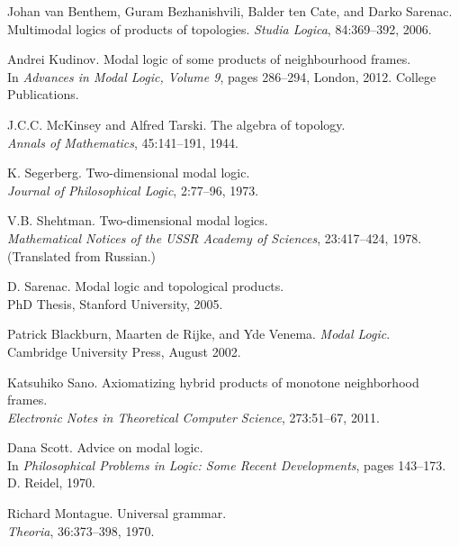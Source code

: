 \documentclass[12pt, a4paper]{scrartcl}
\begin{document}
\begin{enumerate}[label={[{\arabic*}]}]

\item Johan van Benthem, Guram Bezhanishvili, Balder ten Cate, and Darko Sarenac.\\
Multimodal logics of products of topologies. \textit{Studia Logica}, 84:369–392, 2006.

\item Andrei Kudinov. Modal logic of some products of neighbourhood frames.\\
In \textit{Advances in Modal Logic, Volume 9}, pages 286–294, London, 2012. College Publications.

\item J.C.C. McKinsey and Alfred Tarski. The algebra of topology.\\
\textit{Annals of Mathematics}, 45:141–191, 1944.

\item K. Segerberg. Two-dimensional modal logic.\\
\textit{Journal of Philosophical Logic}, 2:77–96, 1973.

\item V.B. Shehtman. Two-dimensional modal logics.\\
\textit{Mathematical Notices of the USSR Academy of Sciences}, 23:417–424, 1978. (Translated from Russian.)

\item D. Sarenac. Modal logic and topological products.\\
PhD Thesis, Stanford University, 2005.

\item Patrick Blackburn, Maarten de Rijke, and Yde Venema. \textit{Modal Logic}.\\
Cambridge University Press, August 2002.

\item Katsuhiko Sano. Axiomatizing hybrid products of monotone neighborhood frames.\\
\textit{Electronic Notes in Theoretical Computer Science}, 273:51–67, 2011.

\item Dana Scott. Advice on modal logic.\\
In \textit{Philosophical Problems in Logic: Some Recent Developments}, pages 143–173. D. Reidel, 1970.

\item Richard Montague. Universal grammar.\\
\textit{Theoria}, 36:373–398, 1970.


\end{enumerate}
\end{document}
